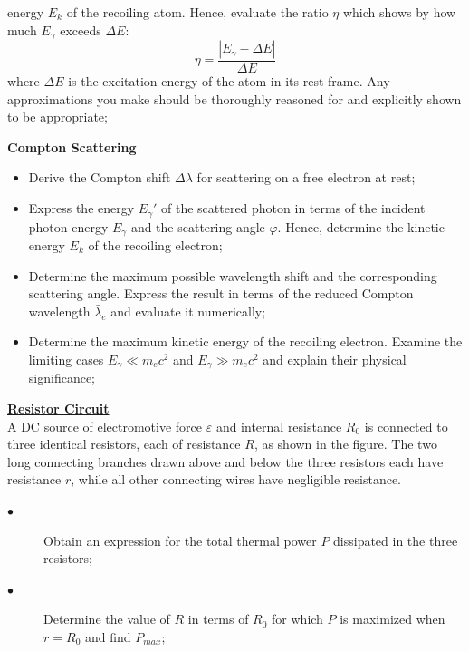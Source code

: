 \documentclass[a4paper]{article}
\begin{document}
\begin{description}[leftmargin=!, labelwidth=\widthof{$\bullet$}]
\begin{itemize}[leftmargin=0.5cm]
			energy $E_k$ of the recoiling atom. Hence, evaluate the ratio $\eta$ which shows by how much $E_{\gamma}$ exceeds $\Delta E$:
			\begin{equation*}
				\eta = \frac{\left| E_{\gamma} - \Delta E \right| }{\Delta E}
			\end{equation*}
			where $\Delta E$ is the excitation energy of the atom in its rest frame. Any approximations you make should be thoroughly reasoned for and explicitly shown to be appropriate;
		\end{itemize}
		\item[$\bullet$] \textbf{Compton Scattering}
		\begin{itemize}[leftmargin=0.5cm]
			\item[$\rightarrow$] Derive the Compton shift $\Delta \lambda$ for scattering on a free electron at rest;
			\item[$\rightarrow$] Express the energy $E_\gamma'$ of the
			scattered photon in terms of the incident photon energy
			$E_\gamma$ and the scattering angle $\varphi$. Hence, determine
			the kinetic energy $E_k$ of the recoiling electron;
			\item[$\rightarrow$] Determine the maximum possible wavelength
			shift and the corresponding scattering angle. Express the result
			in terms of the reduced Compton wavelength $\bar{\lambda}_e$
			and evaluate it numerically;
			\item[$\rightarrow$] Determine the maximum kinetic energy of
			the recoiling electron. Examine the limiting cases
			$E_\gamma \ll m_e c^2$ and $E_\gamma \gg m_e c^2$ and explain
			their physical significance;
		\end{itemize}
	\end{description}
	
	\Problem
	\textbf{\underline{Resistor Circuit}}
	\\
	A DC source of electromotive force $\varepsilon$ and internal
	resistance $R_0$ is connected to three identical resistors, each
	of resistance $R$, as shown in the figure. The two long connecting branches drawn above and below the three resistors each have resistance $r$, while all other connecting wires have negligible resistance.
	\begin{description}
		\item[$\bullet$] Obtain an expression for the total thermal power $P$ dissipated in the three resistors;
		\item[$\bullet$] Determine the value of $R$ in terms of $R_0$ for which $P$ is maximized when $r = R_0$ and find $P_{max}$;
	\end{description}
	
	
	
	
	
\end{document}
